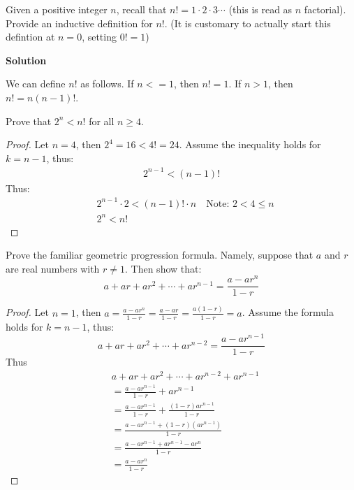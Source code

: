 \begin{tcolorbox}[title=Problem 4, breakable]
    Given a positive integer $n$, recall that $n! = 1 \cdot 2 \cdot 3 \cdots$ (this is read as 
    $n$ factorial). Provide an inductive definition for $n!$. (It  is customary to actually 
    start this defintion at $n = 0$, setting $0! = 1$) 
\end{tcolorbox}

\textbf{Solution}

We can define $n!$ as follows. If $n <=1$, then $n! = 1$. If $n > 1$, then $n!
    = n(n - 1)!$.

\begin{tcolorbox}[title=Problem 5, breakable]
    Prove that $2^n < n!$ for all $n \ge 4$.
\end{tcolorbox}

\begin{proof}
    Let $n = 4$, then $2^4 = 16 < 4! = 24$.
    Assume the inequality holds for $k = n - 1$, thus:
    \begin{align*}
        2^{n - 1} < (n - 1)!
    \end{align*}
    Thus:
    \begin{align*}
         & 2^{n - 1} \cdot 2 < (n - 1)! \cdot n \quad \text{Note: $2 < 4 \le n$} \\
         & 2^n < n! 
    \end{align*}
\end{proof}

\begin{tcolorbox}[title=Problem 7, breakable]
    Prove the familiar geometric progression formula.
    Namely, suppose that $a$ and $r$ are real numbers with $r \not = 1$.
    Then show that:
    \[a + ar  + ar^2 + \cdots + ar^{n - 1} = \frac{a - ar^n}{1 - r}\]
\end{tcolorbox}

\begin{proof}
    Let $n = 1$, then $a = \frac{a - ar^n}{1 - r} = \frac{a - ar}{1 - r} = \frac{a(1 - r)}{1 - r} = a$.
    Assume the formula holds for $k = n - 1$, thus:
    \[a + ar + ar^2 + \cdots + ar^{n - 2} = \frac{a - ar^{n - 1}}{1 - r}\]
    Thus
    \begin{align*}
         & a + ar + ar^2 + \cdots + ar^{n - 2} + ar^{n - 1}                \\
         & =\frac{a - ar^{n - 1}}{1 - r} + ar^{n - 1}                      \\
         & =\frac{a - ar^{n - 1}}{1 - r} + \frac{(1 - r)ar^{n - 1}}{1 - r} \\
         & =\frac{a - ar^{n - 1} + (1 - r)(ar^{n - 1})}{1 - r}             \\
         & =\frac{a - ar^{n - 1} + ar^{n - 1} - ar^n}{1 - r}               \\
         & =\frac{a - ar^n}{1 - r}
    \end{align*}
\end{proof}

